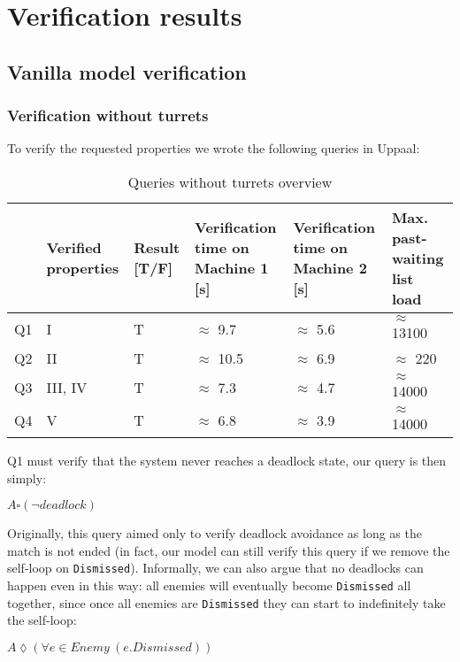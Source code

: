 \documentclass[
10pt, %
a4paper, %
oneside, %
headinclude,footinclude, %
BCOR5mm, %
]{scrartcl}
\begin{document}
	\section{Verification results}
		\subsection{Vanilla model verification}
			\subsubsection{Verification without turrets}
				To verify the requested properties we wrote the following queries in Uppaal:
				\begin{table}[H]
					\centering
					\begin{tabularx}{\textwidth}{||c|>{\raggedright\arraybackslash}X|>{\raggedright\arraybackslash}X|>{\raggedright\arraybackslash}X|>{\raggedright\arraybackslash}X|>{\raggedright\arraybackslash}X||}
						\hline
						 & Verified properties & Result [T/F] & Verification time on Machine 1 [s] & Verification time on Machine 2 [s] & Max. past-waiting list load \\
						\hline
						Q1 & I & T& $\approx$ 9.7 & $\approx$ 5.6& $\approx$ 13100\\ \hline
						Q2 & II & T&  $\approx$ 10.5 & $\approx$ 6.9 & $\approx$ 220\\ \hline
						Q3 & III, IV & T&  $\approx$ 7.3& $\approx$ 4.7 & $\approx$ 14000\\ \hline
						Q4 & V & T&  $\approx$ 6.8& $\approx$ 3.9 & $\approx$ 14000\\
						\hline
					\end{tabularx}
					\caption{Queries without turrets overview}
				\end{table}
				Q1 must verify that the system never reaches a deadlock state, our query is then simply:
				\begin{center}
					$A\square(\lnot deadlock)$
				\end{center}
				Originally, this query aimed only to verify deadlock avoidance as long as the match is not ended (in fact, our model can still verify this query if we remove the self-loop on \texttt{Dismissed}). Informally, we can also argue that no deadlocks can happen even in this way: all enemies will eventually become \texttt{Dismissed} all together, since once all enemies are \texttt{Dismissed} they can start to indefinitely take the self-loop:
				\begin{center}
					$A\lozenge(\forall e \in Enemy\ (e.Dismissed))$
				\end{center}
				
\end{document}
